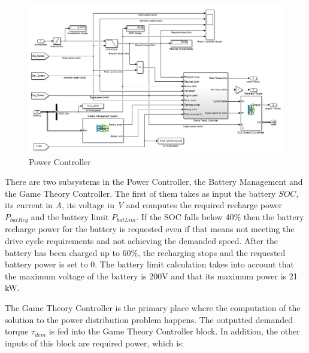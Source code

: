 \begin{figure}[h]
\centering
\includegraphics[scale=0.48]{figures/hev/powercontroller}
\caption{Power Controller}
\label{fig:powercontroller}
\end{figure}

There are two subsystems in the Power Controller, the Battery Management and the Game Theory Controller. The first of them takes as input the battery $SOC$, its current in \textit{A}, its voltage in \textit{V} and computes the required recharge power $P_{batReq}$ and the battery limit $P_{batLim}$. If the SOC falls below 40\% then the battery recharge power for the battery is requested even if that means not meeting the drive cycle requirements and not achieving the demanded speed. After the battery has been charged up to 60\%, the recharging stops and the requested battery power is set to 0. The battery limit calculation takes into account that the maximum voltage of the battery is 200V and that its maximum power is 21 kW.

The Game Theory Controller is the primary place where the computation of the solution to the power distribution problem happens. The outputted demanded torque $\tau_{dem}$ is fed into the Game Theory Controller block. In addition, the other inputs of this block are required power, which is:

